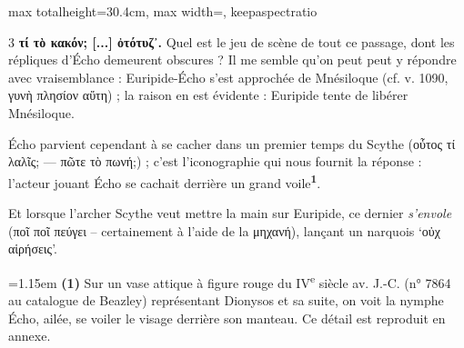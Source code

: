 \documentclass[11pt,twoside]{book}
\newcommand{\currHeadLE}{}
\newcommand{\currHeadRE}{}
\newcommand{\currHeadLO}{}
\newcommand{\currHeadRO}{}
\newcommand{\italique}[1]{\textit{#1}}
\newcommand{\nieme}[1]{#1\textsuperscript{e}}
\newcommand{\R}{\textbf{R}}
\newcommand{\marqueur}[1]{\textsuperscript{\color{rubricRed}\textbf{#1}}}
\begin{document}
\begin{adjustbox}{max totalheight=30.4cm, max width=\textwidth, keepaspectratio}
\begin{minipage}{\textwidth}
{\begin{multicols}{3}
 \textbf{τί τὸ κακόν; [...] ὀτότυζ᾽.} Quel est le jeu de scène de tout ce passage, dont les répliques d'Écho demeurent obscures ? Il me semble qu'on peut peut y répondre avec vraisemblance : Euripide-Écho s'est approchée de Mnésiloque (cf. v. 1090, γυνὴ πλησίον αὕτη) ; la raison en est évidente : Euripide tente de libérer Mnésiloque.
\par\vspace{1.5pt}
\noindent Écho parvient cependant à se cacher dans un premier temps du Scythe (οὖτος τί λαλῖς; --- πῶτε τὸ πωνή;) ; c'est l'iconographie qui nous fournit la réponse : l'acteur jouant Écho se cachait derrière un grand voile\marqueur{1}.
\par\vspace{1.5pt}
\noindent Et lorsque l'archer Scythe veut mettre la main sur Euripide, ce dernier \italique{s'envole} (ποῖ ποῖ πεύγει -- certainement à l'aide de la μηχανή), lançant un narquois `οὐχ αἱρήσεις'.
\par\vspace{1.5pt}
\par\vspace{1.2pt}\par\nopagebreak\vspace{1pt}\noindent\hangindent=1.15em {\color{sepiaNote}\textbf{(1)}} Sur un vase attique à figure rouge du \nieme{IV} siècle av. J.-C. (n° 7864 au catalogue de Beazley) représentant Dionysos et sa suite, on voit la nymphe Écho, ailée, se voiler le visage derrière son manteau. Ce détail est reproduit en annexe.
\par\end{multicols}}
\end{minipage}\end{adjustbox}
\clearpage\ifodd\value{page}\hbox{}\newpage\fi
\renewcommand{\currHeadLE}{ΑΡΙΣΤΟΦΑΝΟΥΣ ΘΕΣΜΟΦΟΡΙΑΖΟΥΣΑΙ · CODEX RAVENNAS 429 (\R)}
\renewcommand{\currHeadRE}{Folio f. 175v (Classense 177v) · vv. 1082–1127}
\renewcommand{\currHeadLO}{FAC-SIMILÉ DU CODEX RAVENNAS 429 (\R) · f. 175v (Classense 177v)}
\renewcommand{\currHeadRO}{vv. 1082–1127 · Planche recadrée sur la zone écrite et harmonisée}
\end{document}
